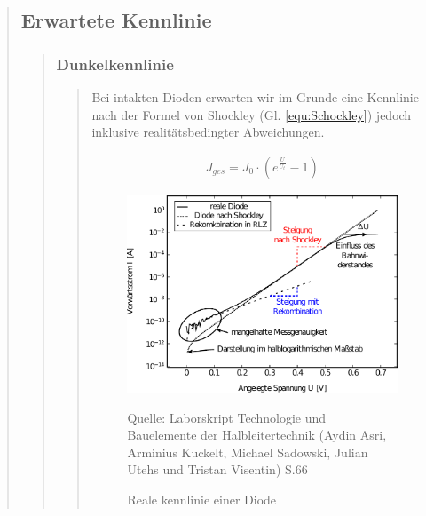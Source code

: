 \begin{quote}
    \subsection{Erwartete Kennlinie}
    \begin{quote}

        \subsubsection{Dunkelkennlinie}
        \begin{quote}



            Bei intakten Dioden erwarten wir im Grunde eine Kennlinie nach der Formel von Shockley (Gl. \ref{equ:Schockley})
            jedoch inklusive realitätsbedingter Abweichungen.



            \begin{equation}
            \begin{split}
            J_{ges} = J_0 \cdot (e^ \frac{U}{U_t} -1)
            \end{split}
            \label{equ:Schockley}
            \end{equation}




            \begin{figure}[htbH]
                \centering
                \includegraphics[scale=0.7, trim = 0cm 0cm 0cm 0cm, clip]{KennlinienBilder/reale_Kennlinie}
                \caption{Reale kennlinie einer Diode}
                    \begin{center}
                        \vspace{0.5em}
                        \small Quelle: Laborskript Technologie und Bauelemente der Halbleitertechnik (Aydin Asri,
                                        Arminius Kuckelt, Michael Sadowski, Julian Utehs und Tristan Visentin) S.66
                    \end{center}
                \label{fig:reale_Kennlinie}
            \end{figure}


\end{quote}
\end{quote}
\end{quote}
